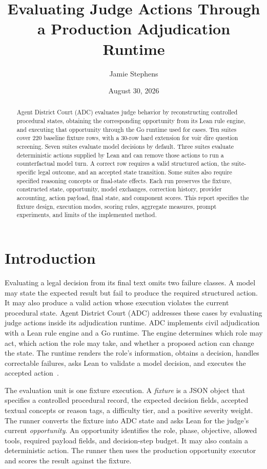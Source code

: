 \documentclass[11pt]{article}
\title{Evaluating Judge Actions Through a Production Adjudication Runtime}
\author{Jamie Stephens}
\date{August 30, 2026}
\begin{document}
\maketitle

\begin{abstract}
Agent District Court (ADC) evaluates judge behavior by reconstructing controlled procedural states, obtaining the corresponding opportunity from its Lean rule engine, and executing that opportunity through the Go runtime used for cases.  Ten suites cover 220 baseline fixture rows, with a 30-row hard extension for voir dire question screening.  Seven suites evaluate model decisions by default.  Three suites evaluate deterministic actions supplied by Lean and can remove those actions to run a counterfactual model turn.  A correct row requires a valid structured action, the suite-specific legal outcome, and an accepted state transition.  Some suites also require specified reasoning concepts or final-state effects.  Each run preserves the fixture, constructed state, opportunity, model exchanges, correction history, provider accounting, action payload, final state, and component scores.  This report specifies the fixture design, execution modes, scoring rules, aggregate measures, prompt experiments, and limits of the implemented method.
\end{abstract}

\section{Introduction}

Evaluating a legal decision from its final text omits two failure classes.  A model may state the expected result but fail to produce the required structured action.  It may also produce a valid action whose execution violates the current procedural state.  Agent District Court (ADC) addresses these cases by evaluating judge actions inside its adjudication runtime.  ADC implements civil adjudication with a Lean rule engine and a Go runtime.  The engine determines which role may act, which action the role may take, and whether a proposed action can change the state.  The runtime renders the role's information, obtains a decision, handles correctable failures, asks Lean to validate a model decision, and executes the accepted action~\cite{adcrepo,runtime}.

The evaluation unit is one fixture execution.  A \emph{fixture} is a JSON object that specifies a controlled procedural record, the expected decision fields, accepted textual concepts or reason tags, a difficulty tier, and a positive severity weight.  The runner converts the fixture into ADC state and asks Lean for the judge's current \emph{opportunity}.  An opportunity identifies the role, phase, objective, allowed tools, required payload fields, and decision-step budget.  It may also contain a deterministic action.  The runner then uses the production opportunity executor and scores the result against the fixture.
\end{document}
